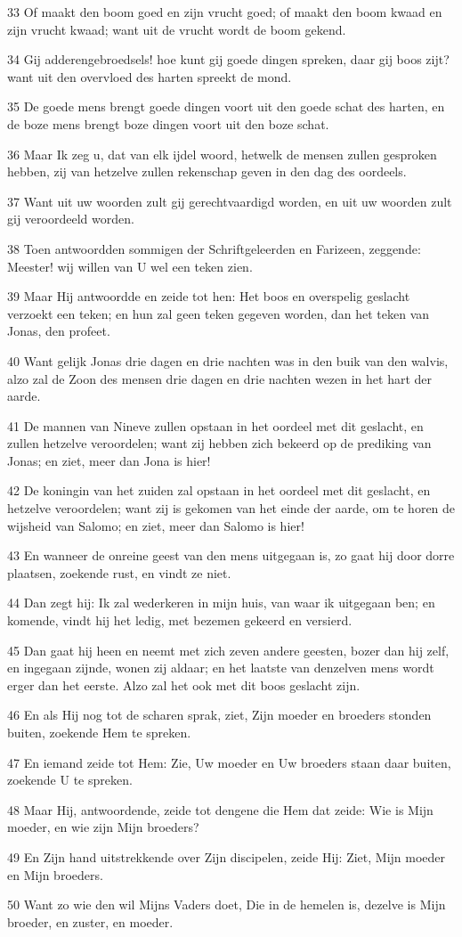 \par 33 Of maakt den boom goed en zijn vrucht goed; of maakt den boom kwaad en zijn vrucht kwaad; want uit de vrucht wordt de boom gekend.
\par 34 Gij adderengebroedsels! hoe kunt gij goede dingen spreken, daar gij boos zijt? want uit den overvloed des harten spreekt de mond.
\par 35 De goede mens brengt goede dingen voort uit den goede schat des harten, en de boze mens brengt boze dingen voort uit den boze schat.
\par 36 Maar Ik zeg u, dat van elk ijdel woord, hetwelk de mensen zullen gesproken hebben, zij van hetzelve zullen rekenschap geven in den dag des oordeels.
\par 37 Want uit uw woorden zult gij gerechtvaardigd worden, en uit uw woorden zult gij veroordeeld worden.
\par 38 Toen antwoordden sommigen der Schriftgeleerden en Farizeen, zeggende: Meester! wij willen van U wel een teken zien.
\par 39 Maar Hij antwoordde en zeide tot hen: Het boos en overspelig geslacht verzoekt een teken; en hun zal geen teken gegeven worden, dan het teken van Jonas, den profeet.
\par 40 Want gelijk Jonas drie dagen en drie nachten was in den buik van den walvis, alzo zal de Zoon des mensen drie dagen en drie nachten wezen in het hart der aarde.
\par 41 De mannen van Nineve zullen opstaan in het oordeel met dit geslacht, en zullen hetzelve veroordelen; want zij hebben zich bekeerd op de prediking van Jonas; en ziet, meer dan Jona is hier!
\par 42 De koningin van het zuiden zal opstaan in het oordeel met dit geslacht, en hetzelve veroordelen; want zij is gekomen van het einde der aarde, om te horen de wijsheid van Salomo; en ziet, meer dan Salomo is hier!
\par 43 En wanneer de onreine geest van den mens uitgegaan is, zo gaat hij door dorre plaatsen, zoekende rust, en vindt ze niet.
\par 44 Dan zegt hij: Ik zal wederkeren in mijn huis, van waar ik uitgegaan ben; en komende, vindt hij het ledig, met bezemen gekeerd en versierd.
\par 45 Dan gaat hij heen en neemt met zich zeven andere geesten, bozer dan hij zelf, en ingegaan zijnde, wonen zij aldaar; en het laatste van denzelven mens wordt erger dan het eerste. Alzo zal het ook met dit boos geslacht zijn.
\par 46 En als Hij nog tot de scharen sprak, ziet, Zijn moeder en broeders stonden buiten, zoekende Hem te spreken.
\par 47 En iemand zeide tot Hem: Zie, Uw moeder en Uw broeders staan daar buiten, zoekende U te spreken.
\par 48 Maar Hij, antwoordende, zeide tot dengene die Hem dat zeide: Wie is Mijn moeder, en wie zijn Mijn broeders?
\par 49 En Zijn hand uitstrekkende over Zijn discipelen, zeide Hij: Ziet, Mijn moeder en Mijn broeders.
\par 50 Want zo wie den wil Mijns Vaders doet, Die in de hemelen is, dezelve is Mijn broeder, en zuster, en moeder.


